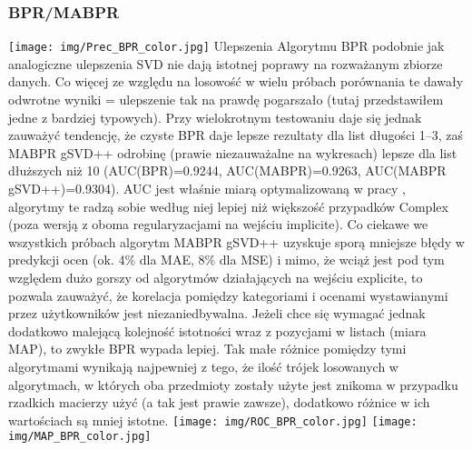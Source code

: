 \documentclass{pracamgr}
\begin{document}
    \subsubsection{BPR/MABPR}
     \texttt{[image: img/Prec\_BPR\_color.jpg]}\newline
     Ulepszenia Algorytmu BPR podobnie jak analogiczne ulepszenia SVD nie dają istotnej poprawy na rozważanym zbiorze danych.
     Co więcej ze względu na losowość w wielu próbach porównania te dawały odwrotne wyniki = ulepszenie tak na prawdę pogarszało (tutaj przedstawiłem jedne z bardziej typowych).
     Przy wielokrotnym testowaniu daje się jednak zauważyć tendencję, że czyste BPR daje lepsze rezultaty dla list długości 1--3,
     zaś MABPR gSVD++ odrobinę (prawie niezauważalne na wykresach) lepsze dla list dłuższych niż 10 (AUC(BPR)=0.9244, AUC(MABPR)=0.9263, AUC(MABPR gSVD++)=0.9304).
     AUC jest właśnie miarą optymalizowaną w pracy \cite{191}, algorytmy te radzą sobie według niej lepiej niż większość przypadków Complex
     (poza wersją z oboma regularyzacjami na wejściu implicite).
     Co ciekawe we wszystkich próbach algorytm MABPR gSVD++ uzyskuje sporą mniejsze błędy w predykcji ocen (ok. 4\% dla MAE, 8\% dla MSE) i mimo,
     że wciąż jest pod tym względem dużo gorszy od algorytmów działających na wejściu explicite, to pozwala zauważyć,
     że korelacja pomiędzy kategoriami i ocenami wystawianymi przez użytkowników jest niezaniedbywalna.
     Jeżeli chce się wymagać jednak dodatkowo malejącą kolejność istotności wraz z pozycjami w listach (miara MAP), to zwykłe BPR wypada lepiej.
     Tak małe różnice pomiędzy tymi algorytmami wynikają najpewniej z tego, że ilość trójek losowanych w algorytmach, w których oba przedmioty
     zostały użyte jest znikoma w przypadku rzadkich macierzy użyć (a tak jest prawie zawsze), dodatkowo różnice w ich wartościach są mniej istotne.\newline
     \texttt{[image: img/ROC\_BPR\_color.jpg]}
     \texttt{[image: img/MAP\_BPR\_color.jpg]}    
\end{document}
